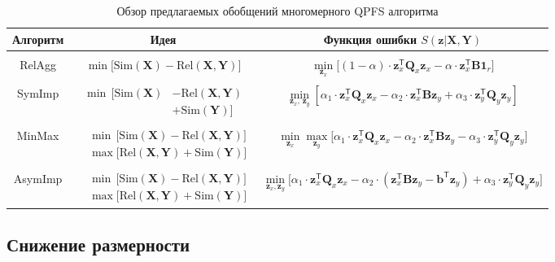 \documentclass[preprint,12pt]{elsarticle}
\theoremstyle{definition}
\newcommand{\bz}{\mathbf{z}}
\newcommand{\bb}{\mathbf{b}}
\newcommand{\bY}{\mathbf{Y}}
\newcommand{\bX}{\mathbf{X}}
\newcommand{\bB}{\mathbf{B}}
\newcommand{\bQ}{\mathbf{Q}}
\newcommand{\T}{\mathsf{T}}
\newcommand{\bOne}{\boldsymbol{1}}
\begin{document}
\begin{table}
	\centering
	\caption{Обзор предлагаемых обобщений многомерного QPFS алгоритма}
	\small{
		\begin{tabular}{c|c|c}
			\hline
			Алгоритм & Идея & Функция ошибки $S(\bz | \bX, \bY)$ \\
			\hline && \\ [-.5em]
			RelAgg & $\min \bigl[ \text{Sim}(\bX) - \text{Rel}(\bX, \bY) \bigr] $ & $\min\limits_{\bz_x} \bigl[ (1 - \alpha) \cdot \bz_x^{\T} \bQ_x \bz_x - \alpha \cdot \bz_x^{\T} \bB \bOne_r \bigr] $ \\ &&\\[-.5em]
			SymImp & $\begin{aligned} \min \, \bigl[ \text{Sim}(\bX) & - \text{Rel}(\bX, \bY) \\ & + \text{Sim}(\bY) \bigr] \end{aligned}$ & $ \min\limits_{\bz_x, \, \bz_y} \left[ \alpha_1 \cdot \bz_x^{\T} \bQ_x \bz_x - \alpha_2 \cdot \bz_x^{\T} \bB \bz_y + \alpha_3 \cdot \bz_y^{\T} \bQ_y \bz_y \right] $\\ &&\\ [-.5em]
			MinMax & $\begin{aligned} &\min \, \bigl[ \text{Sim}(\bX) - \text{Rel}(\bX, \bY) \bigr]  \\ & \max \bigl[\text{Rel}(\bX, \bY) + \text{Sim}(\bY) \bigr] \end{aligned}$ & $	\min\limits_{\bz_x} 	\max\limits_{\bz_y} \bigl[\alpha_1 \cdot \bz_x^{\T} \bQ_x \bz_x - \alpha_2 \cdot \bz_x^{\T} \bB \bz_y - \alpha_3 \cdot \bz_y^{\T} \bQ_y \bz_y \bigr]$ \\ &&\\ [-.5em]
			AsymImp & $\begin{aligned} & \min \, \bigl[ \text{Sim}(\bX) - \text{Rel}(\bX, \bY) \bigr]\\ &  \max \bigl[\text{Rel}(\bX, \bY) + \text{Sim}(\bY) \bigr] \end{aligned}$ & $\min\limits_{\bz_x, \bz_y} \bigl[ \alpha_1 \cdot \bz_x^{\T} \bQ_x \bz_x - \alpha_2 \cdot \left(\bz_x^{\T} \bB \bz_y - \bb^{\T} \bz_y \right) + \alpha_3 \cdot \bz_y^{\T} \bQ_y \bz_y \bigr]$\\ 
			\hline
	\end{tabular}}
	\label{tbl:summary}
\end{table}


\subsection{Снижение размерности}
\end{document}
